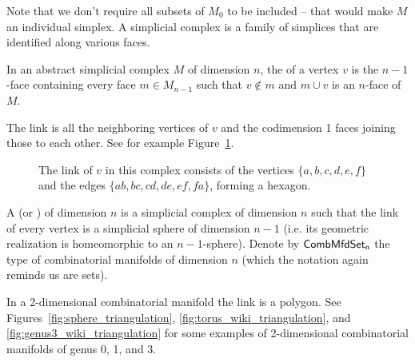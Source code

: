 Note that we don't require all subsets of \( M_0 \) to be included -- that would make \( M \) an individual simplex. A simplicial complex is a family of simplices that are identified along various faces.

\begin{mydef}
In an abstract simplicial complex \( M \) of dimension \( n \), the  of a vertex \( v \) is the \( n-1 \)-face containing every face \( m\in M_{n-1} \) such that \( v\notin m \) and \( m\cup v \) is an \( n \)-face of \( M \).
\end{mydef}

The link is all the neighboring vertices of \( v \) and the codimension 1 faces joining those to each other. See for example Figure~\ref{fig:link}.

\begin{figure}[htbp]
\centering
{}
\caption{The link of \( v \) in this complex consists of the vertices \( \{a,b,c,d,e,f\} \) and the edges \( \{ab,bc,cd,de,ef,fa\} \), forming a hexagon.}
\label{fig:link}
\end{figure}

\begin{mydef}
A  (or ) of dimension \( n \) is a simplicial complex of dimension \( n \) such that the link of every vertex is a simplicial sphere of dimension \( n-1 \) (i.e. its geometric realization is homeomorphic to an \( n-1 \)-sphere). Denote by \( \mathsf{CombMfdSet_n} \) the type of combinatorial manifolds of dimension \( n \) (which the notation again reminds us are sets).
\end{mydef}

In a 2-dimensional combinatorial manifold the link is a polygon. See Figures~\ref{fig:sphere_triangulation}, \ref{fig:torus_wiki_triangulation}, and \ref{fig:genus3_wiki_triangulation} for some examples of 2-dimensional combinatorial manifolds of genus 0, 1, and 3.

